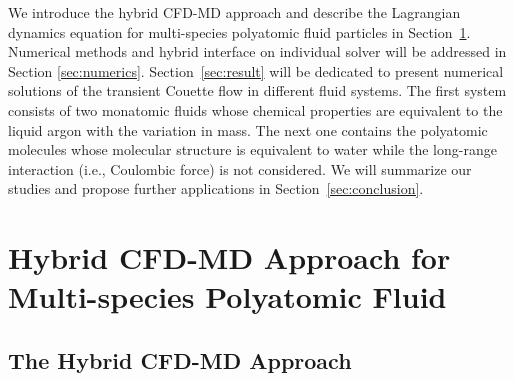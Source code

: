 \documentclass[]{aiaa-tc}%
\begin{document}
We introduce the hybrid CFD-MD approach and describe the Lagrangian dynamics equation
for multi-species polyatomic fluid particles in Section~\ref{sec:hybrid}. Numerical
methods and hybrid interface on individual solver will be addressed in Section
\ref{sec:numerics}. Section~\ref{sec:result} will be dedicated to present 
numerical solutions of the transient Couette flow in different fluid systems.
The first system consists of two monatomic fluids whose chemical properties are
equivalent to the liquid argon with the variation in mass. The next one contains
the polyatomic molecules whose molecular structure is equivalent to water while
the long-range interaction (i.e., Coulombic force) is not considered. We will 
summarize our studies and propose further applications in Section~\ref{sec:conclusion}.


\section{Hybrid CFD-MD Approach for Multi-species Polyatomic Fluid}
\label{sec:hybrid}

\subsection{The Hybrid CFD-MD Approach}
\label{sec:hybrid_design}
\end{document}

